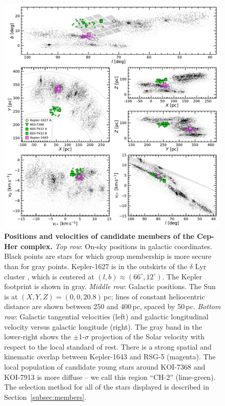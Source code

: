 \documentclass[12pt,twocolumn]{aastex63}
\begin{document}
\begin{figure}[t]
	\begin{center}
		\leavevmode
		\includegraphics[width=0.99\textwidth]{f1.pdf}
	\end{center}
	\vspace{-0.7cm}
	\caption{
  {\bf Positions and velocities of candidate members of the Cep-Her
  complex.}
  {\it Top row}: On-sky positions in galactic coordinates.  Black
  points are stars for which group membership is more secure than for
  gray points.  Kepler-1627 is in the outskirts of the $\delta$ Lyr
  cluster \citep{bouma_kep1627_2022}, which is centered at $(l,b)
  \approx (66^\circ, 12^\circ)$.
  The Kepler footprint is shown in gray.
  {\it Middle row}: Galactic positions.  The Sun is at $(X, Y, Z) =
  (0, 0, 20.8)$\,pc; lines of constant heliocentric distance are
  shown between 250 and 400\,pc, spaced by 50\,pc.
  {\it Bottom row}: Galactic tangential velocities (left) and
  galactic longitudinal velocity versus galactic longitude (right).
  The gray band in the lower-right shows the $\pm$1-$\sigma$
  projection of the Solar velocity with respect to the local standard
  of rest.  There is a strong spatial and kinematic overlap between
  Kepler-1643 and RSG-5 (magenta).  The local population
  of candidate young stars around KOI-7368 and KOI-7913 is more
  diffuse -- we call this region ``CH-2'' (lime-green).
  The selection method for all of the stars displayed
  is described in Section~\ref{subsec:members}.
	\label{fig:XYZvtang}
	}
\end{figure}
\end{document}

